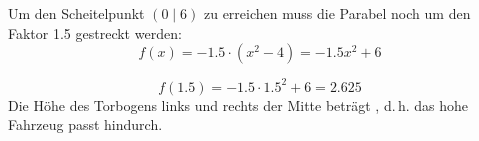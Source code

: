 \begin{exercise}
\begin{minipage}{11cm}
      Um den Scheitelpunkt $(0\mid6)$ zu erreichen muss die Parabel noch um den Faktor \num{1.5}
      gestreckt werden:
      \begin{equation*}
        f(x)=-\num{1.5}\cdot(x^2-4)=-\num{1.5}x^2+6
      \end{equation*}
    \end{minipage}%
  \fi
  \ifoutcome\outcome\par
    \begin{equation*}
      f(\num{1.5})=-\num{1.5}\cdot\num{1.5}^2+6=\num{2.625}
    \end{equation*}
    Die Höhe des Torbogens  links und rechts der Mitte beträgt
    , d.\,h. das  hohe Fahrzeug passt hindurch.
  \fi
\end{exercise}
